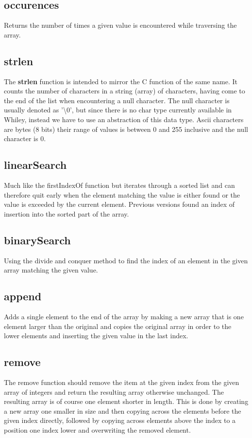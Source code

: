 \documentclass[10pt]{article} %
\begin{document}
\subsection{occurences}
Returns the number of times a given value is encountered while traversing the array.

\subsection{strlen}
The \textbf{strlen} function is intended to mirror the C function of the same name. It counts the number of characters in a string (array) of characters, having come to the end of the list when encountering a null character. The null character is usually denoted as '\textbackslash0', but since there is no char type currently available in Whiley, instead we have to use an abstraction of this data type. Ascii characters are bytes (8 bits) their range of values is between 0 and 255 inclusive and the null character is 0.

\subsection{linearSearch}
Much like the firstIndexOf function but iterates through a sorted list and can therefore quit early when the element matching the value is either found or the value is exceeded by the current element. Previous versions found an index of insertion into the sorted part of the array.

\subsection{binarySearch}
Using the divide and conquer method to find the index of an element in the given array matching the given value.

\subsection{append}
Adds a single element to the end of the array by making a new array that is one element larger than the original and copies the original array in order to the lower elements and inserting the given value in the last index.

\subsection{remove}
The remove function should remove the item at the given index from the given array of integers and return the resulting array otherwise unchanged. The resulting array is of course one element shorter in length. This is done by creating a new array one smaller in size and then copying across the elements before the given index directly, followed by copying across elements above the index to a position one index lower and overwriting the removed element.
\end{document}
